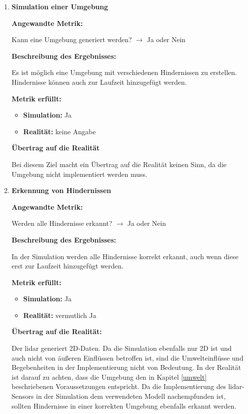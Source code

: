 \begin{enumerate}[leftmargin=*]
    \item \textbf{Simulation einer Umgebung}
    
    \textbf{Angewandte Metrik:}

    Kann eine Umgebung generiert werden? $\to$ Ja oder Nein

    \textbf{Beschreibung des Ergebnisses:}

    Es ist möglich eine Umgebung mit verschiedenen Hindernissen zu erstellen. 
    Hindernisse können auch zur Laufzeit hinzugefügt werden. 

    \textbf{Metrik erfüllt:}
    
    \begin{itemize}
        \item \textbf{Simulation:} Ja
        \item \textbf{Realität:} keine Angabe
    \end{itemize}

    \textbf{Übertrag auf die Realität}

    Bei diesem Ziel macht ein Übertrag auf die Realität keinen Sinn, da die Umgebung nicht implementiert werden muss.
    \item \textbf{Erkennung von Hindernissen}

    \textbf{Angewandte Metrik:}

    Werden alle Hindernisse erkannt? $\to$ Ja oder Nein

    \textbf{Beschreibung des Ergebnisses:}

    In der Simulation werden alle Hindernisse korrekt erkannt, auch wenn diese erst zur Laufzeit hinzugefügt werden.   

    \textbf{Metrik erfüllt:}
    \begin{itemize}
        \item \textbf{Simulation:} Ja
        \item \textbf{Realität:} vermutlich Ja
    \end{itemize}
    
    \textbf{Übertrag auf die Realität:}

    Der \ac{lidar} generiert 2D-Daten. Da die Simulation ebenfalls nur 2D ist und auch nicht von äußeren Einflüssen betroffen ist,
    sind die Umwelteinflüsse und Begebenheiten in der Implementierung nicht von Bedeutung.
    In der Realität ist darauf zu achten, dass die Umgebung den in Kapitel \ref{umwelt} beschriebenen Voraussetzungen entspricht. 
    Da die Implementierung des \ac{lidar}-Sensors in der Simulation dem verwendeten Modell nachempfunden ist, 
    sollten Hindernisse in einer korrekten Umgebung ebenfalls erkannt werden.



\end{enumerate}

